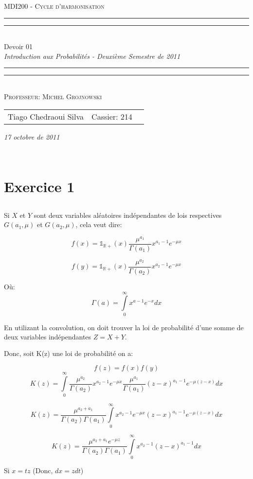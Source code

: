 \documentclass[a4paper]{article}
\date{Octobre 17, 2011}
\newcommand*{\titleTMB}{\begingroup \centering \settowidth{\unitlength}{\LARGE EE531} {\large\scshape MDI200 - Cycle d'harmonisation }\\[0.2\baselineskip] \rule{11.0cm}{1.6pt}\vspace*{-\baselineskip}\vspace*{2pt} \rule{11.0cm}{0.4pt}\\[\baselineskip] {\LARGE Devoir 01}\\\vspace*{\baselineskip}  {\itshape Introduction aux Probabilités - Deuxième Semestre de 2011}\\ \rule{11.0cm}{0.4pt}\vspace*{-\baselineskip}\vspace{3.2pt} \rule{11.0cm}{1.6pt}\\[\baselineskip] {\large\scshape Professeur: Michel Grojnowski}\par \vfill {\normalsize   \scshape 
    \begin{center} 
      \begin{tabular}{  l  l  p{5cm} } 
        Tiago Chedraoui Silva  & Cassier: 214\\
      \end{tabular} \end{center}
    \itshape 17 octobre de 2011    }\\[\baselineskip] \vspace{3.2pt} \endgroup}
\begin{document}
\titleTMB 
\newpage

\section{Exercice 1}

\subsection{}
Si $X$ et $Y$ sont deux variables aléatoires indépendantes de lois respectives $G(a_1,\mu)$ et $G(a_2,\mu)$, cela veut dire:

\begin{equation}
f(x)=\mathds{1}_{\mathbb{R}+}(x)\frac{\mu^{a_1}}{\Gamma (a_1)}x^{a_1-1}e^{-\mu x}
\end{equation}

\begin{equation}
f(y)=\mathds{1}_{\mathbb{R}+}(x)\frac{\mu^{a_2}}{\Gamma (a_2)}x^{a_2-1}e^{-\mu x}
\end{equation}

Où:
\begin{equation}
\Gamma \left( a \right) = \int\limits_0^\infty {x^{a - 1} } e^{ - x} dx  
\end{equation}

En utilizant la convolution, on doit trouver la loi de probabilité d'une somme de deux variables indépendantes $Z = X + Y$. 

Donc, soit K(z) une loi de probabilité on a:

\begin{equation}
f(z)=f(x)f(y)
\end{equation}
\begin{equation}
K(z)= \int\limits_0^\infty\frac{\mu^{a_2}}{\Gamma (a_2)}x^{a_2-1}e^{-\mu x} \frac{\mu^{a_1}}{\Gamma (a_1)}(z-x)^{a_1-1}e^{-\mu (z-x)}dx
\end{equation}

\begin{equation}
K(z)=\frac{\mu^{a_2+a_1}}{\Gamma (a_2)\Gamma (a_1)}\int\limits_0^\infty{x^{a_2-1}e^{-\mu x} }(z-x)^{a_1-1}e^{-\mu (z-x)}dx
\end{equation}


\begin{equation}
K(z)=\frac{\mu^{a_2+a_1}e^{-\mu z}}{\Gamma (a_2)\Gamma (a_1)}\int\limits_0^\infty{x^{a_2-1}}(z-x)^{a_1-1}dx
\end{equation}

Si $x = tz$ (Donc, $dx = zdt$)
\end{document}
